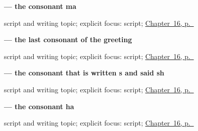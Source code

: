 \noindent\begin{minipage}[t]{\linewidth}
\raggedright
\textbf{ — the consonant ma}\par
\footnotesize script and writing topic; explicit focus: script; \hyperref[ch:bn-script-first]{Chapter~16, p.~\pageref*{ch:bn-script-first}}
\end{minipage}\par\smallskip

\noindent\begin{minipage}[t]{\linewidth}
\raggedright
\textbf{ — the last consonant of the greeting}\par
\footnotesize script and writing topic; explicit focus: script; \hyperref[ch:bn-script-first]{Chapter~16, p.~\pageref*{ch:bn-script-first}}
\end{minipage}\par\smallskip

\noindent\begin{minipage}[t]{\linewidth}
\raggedright
\textbf{ — the consonant that is written s and said sh}\par
\footnotesize script and writing topic; explicit focus: script; \hyperref[ch:bn-script-first]{Chapter~16, p.~\pageref*{ch:bn-script-first}}
\end{minipage}\par\smallskip

\noindent\begin{minipage}[t]{\linewidth}
\raggedright
\textbf{ — the consonant ha}\par
\footnotesize script and writing topic; explicit focus: script; \hyperref[ch:bn-script-first]{Chapter~16, p.~\pageref*{ch:bn-script-first}}
\end{minipage}\par\smallskip
